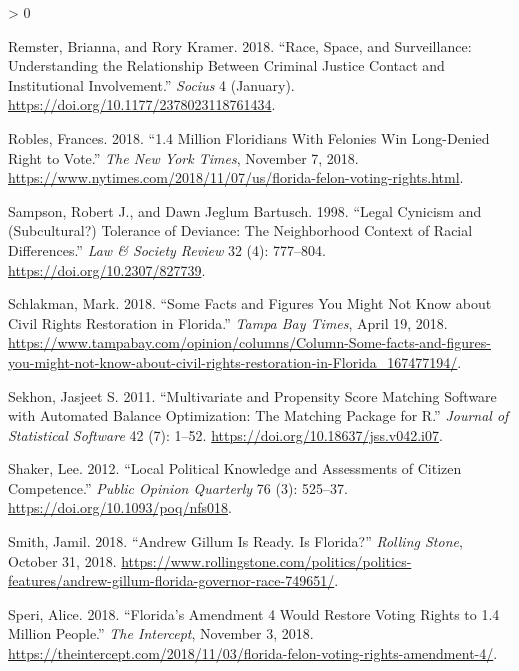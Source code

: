 \documentclass[
  12pt,
]{article}
\newlength{\cslhangindent}
\newenvironment{CSLReferences}[2] %
 {%
  \setlength{\parindent}{0pt}
  \ifodd #1 \everypar{\setlength{\hangindent}{\cslhangindent}}\ignorespaces\fi
  \ifnum #2 > 0
  \setlength{\parskip}{#2\baselineskip}
  \fi
 }%
 {}
\begin{document}
\begin{CSLReferences}{1}{0}
\leavevmode\hypertarget{ref-Remster2018}{}%
Remster, Brianna, and Rory Kramer. 2018. {``Race, {Space}, and {Surveillance}: {Understanding} the {Relationship} Between {Criminal Justice Contact} and {Institutional Involvement}.''} \emph{Socius} 4 (January). \url{https://doi.org/10.1177/2378023118761434}.

\leavevmode\hypertarget{ref-Robles2018}{}%
Robles, Frances. 2018. {``1.4 {Million Floridians With Felonies Win Long}-{Denied Right} to {Vote}.''} \emph{The New York Times}, November 7, 2018. \url{https://www.nytimes.com/2018/11/07/us/florida-felon-voting-rights.html}.

\leavevmode\hypertarget{ref-Sampson1998}{}%
Sampson, Robert J., and Dawn Jeglum Bartusch. 1998. {``Legal {Cynicism} and ({Subcultural}?) {Tolerance} of {Deviance}: {The Neighborhood Context} of {Racial Differences}.''} \emph{Law \& Society Review} 32 (4): 777--804. \url{https://doi.org/10.2307/827739}.

\leavevmode\hypertarget{ref-Schlakman2018}{}%
Schlakman, Mark. 2018. {``Some Facts and Figures You Might Not Know about Civil Rights Restoration in {Florida}.''} \emph{Tampa Bay Times}, April 19, 2018. \url{https://www.tampabay.com/opinion/columns/Column-Some-facts-and-figures-you-might-not-know-about-civil-rights-restoration-in-Florida_167477194/}.

\leavevmode\hypertarget{ref-Sekhon2011}{}%
Sekhon, Jasjeet S. 2011. {``Multivariate and {Propensity Score Matching Software} with {Automated Balance Optimization}: {The Matching} Package for {R}.''} \emph{Journal of Statistical Software} 42 (7): 1--52. \url{https://doi.org/10.18637/jss.v042.i07}.

\leavevmode\hypertarget{ref-Shaker2012}{}%
Shaker, Lee. 2012. {``Local {Political Knowledge} and {Assessments} of {Citizen Competence}.''} \emph{Public Opinion Quarterly} 76 (3): 525--37. \url{https://doi.org/10.1093/poq/nfs018}.

\leavevmode\hypertarget{ref-Smith2018}{}%
Smith, Jamil. 2018. {``Andrew {Gillum Is Ready}. {Is Florida}?''} \emph{Rolling Stone}, October 31, 2018. \url{https://www.rollingstone.com/politics/politics-features/andrew-gillum-florida-governor-race-749651/}.

\leavevmode\hypertarget{ref-Speri2018}{}%
Speri, Alice. 2018. {``Florida's {Amendment} 4 {Would Restore Voting Rights} to 1.4 {Million People}.''} \emph{The Intercept}, November 3, 2018. \url{https://theintercept.com/2018/11/03/florida-felon-voting-rights-amendment-4/}.


\end{CSLReferences}
\end{document}
